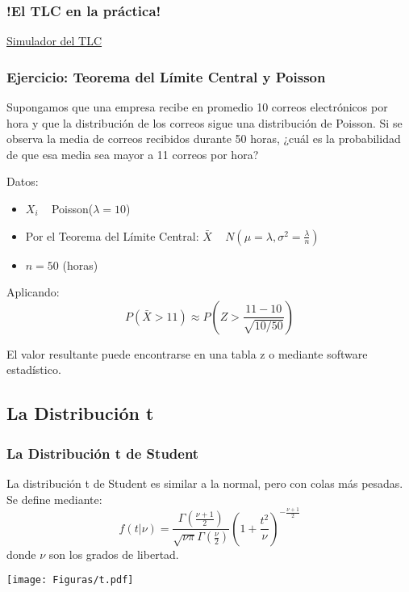 \documentclass[aspectratio=169]{beamer}
\begin{document}
\begin{frame}
\frametitle{!El TLC en la práctica!}
\centering
\href{https://onlinestatbook.com/stat_sim/sampling_dist/index.html}{\huge Simulador del TLC}
\end{frame}


\begin{frame}
\frametitle{Ejercicio: Teorema del Límite Central y Poisson}

Supongamos que una empresa recibe en promedio 10 correos electrónicos por hora y que la distribución de los correos sigue una distribución de Poisson. Si se observa la media de correos recibidos durante 50 horas, ¿cuál es la probabilidad de que esa media sea mayor a 11 correos por hora?

Datos:
\begin{itemize}
    \item \( X_i \) ~ Poisson(\(\lambda = 10\))
    \item Por el Teorema del Límite Central: \(\bar{X} \) ~ \( N\left(\mu = \lambda, \sigma^2 = \frac{\lambda}{n}\right) \)
    \item \( n = 50 \) (horas)
\end{itemize}

Aplicando:
\[
P(\bar{X} > 11) \approx P\left(Z > \frac{11 - 10}{\sqrt{10/50}}\right)
\]

El valor resultante puede encontrarse en una tabla z o mediante software estadístico.

\end{frame}


\subsection{La Distribución t}
\begin{frame}
\frametitle{La Distribución t de Student}
La distribución t de Student es similar a la normal, pero con colas más pesadas. Se define mediante:
\[
f(t | \nu) = \frac{\Gamma(\frac{\nu+1}{2})}{\sqrt{\nu\pi}\Gamma(\frac{\nu}{2})} \left(1 + \frac{t^2}{\nu}\right)^{-\frac{\nu+1}{2}}
\]
donde \(\nu\) son los grados de libertad.
\end{frame}




\begin{frame}

\begin{center}
\texttt{[image: Figuras/t.pdf]}
\end{center}

\end{frame}
\end{document}
